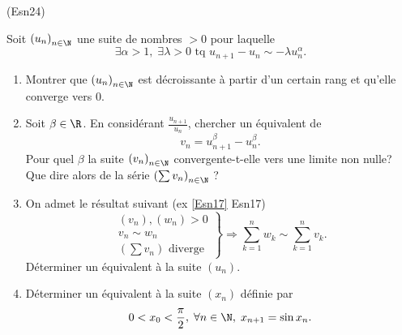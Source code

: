 \begin{tiny}(Esn24)\end{tiny} Soit $\left( u_n \right)_{n \in \N}$ une suite de nombres $>0$ pour laquelle
\[
 \exists \alpha >1, \; \exists \lambda > 0 \text{ tq }
 u_{n+1} - u_n \sim -\lambda u_n^{\alpha}.
\]
\begin{enumerate}
 \item Montrer que $\left( u_n \right)_{n \in \N}$ est décroissante à partir d'un certain rang et qu'elle converge vers $0$.
 \item Soit $\beta \in \R$. En considérant $\frac{u_{n+1}}{u_n}$, chercher un équivalent de
\[
 v_n = u_{n+1}^{\beta} - u_n^{\beta}.
\]
Pour quel $\beta$ la suite $\left( v_n \right)_{n \in \N}$ convergente-t-elle vers une limite non nulle? Que dire alors de la série $\left( \sum v_n \right)_{n \in \N}$ ?
 \item On admet le résultat suivant (ex \ref{Esn17} Esn17)
\[
\left. 
\begin{aligned}
 (v_n), (w_n) > 0\\
 v_n \sim w_n\\
 (\sum v_n) \text{ diverge}
\end{aligned}
\right\rbrace \Rightarrow 
\sum_{k=1}^n w_k \sim \sum_{k=1}^n v_k.
\]
Déterminer un équivalent à la suite $(u_n)$.

 \item Déterminer un équivalent à la suite $(x_n)$ définie par 
\[
 0 < x_0 < \frac{\pi}{2}, \;
\forall n\in \N, \; x_{n+1} = \sin x_n.
\]
\end{enumerate}
